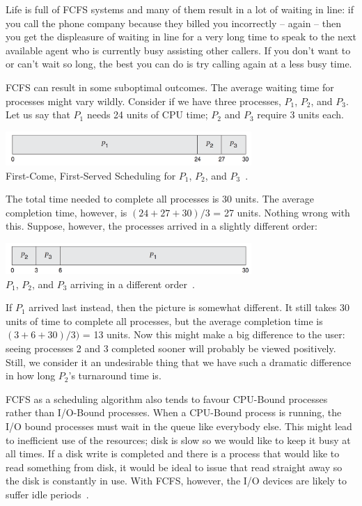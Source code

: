 Life is full of FCFS systems and many of them result in a lot of waiting in line: if you call the phone company because they billed you incorrectly -- again -- then you get the displeasure of waiting in line for a very long time to speak to the next available agent who is currently busy assisting other callers. If you don't want to or can't wait so long, the best you can do is try calling again at a less busy time.

FCFS can result in some suboptimal outcomes. The average waiting time for processes might vary wildly. Consider if we have three processes, $P_{1}$, $P_{2}$, and $P_{3}$. Let us say that $P_{1}$ needs 24 units of CPU time; $P_{2}$ and $P_{3}$ require 3 units each.

\begin{center}
	\includegraphics[width=0.7\textwidth]{images/fcfs-1.png}\\
	First-Come, First-Served Scheduling for $P_{1}$, $P_{2}$, and $P_{3}$~\cite{osc}.
\end{center}

The total time needed to complete all processes is 30 units. The average completion time, however, is $(24 + 27 + 30) / 3$ = 27 units. Nothing wrong with this. Suppose, however, the processes arrived in a slightly different order:

\begin{center}
	\includegraphics[width=0.7\textwidth]{images/fcfs-2.png}\\
	$P_{1}$, $P_{2}$, and $P_{3}$ arriving in a different order~\cite{osc}.
\end{center}

If $P_{1}$ arrived last instead, then the picture is somewhat different. It still takes 30 units of time to complete all processes, but the average completion time is $(3 + 6 + 30) / 3)$ = 13 units. Now this might make a big difference to the user: seeing processes 2 and 3 completed sooner will probably be viewed positively. Still, we consider it an undesirable thing that we have such a dramatic difference in how long $P_{2}$'s turnaround time is.

FCFS as a scheduling algorithm also tends to favour CPU-Bound processes rather than I/O-Bound processes. When a CPU-Bound process is running, the I/O bound processes must wait in the queue like everybody else. This might lead to inefficient use of the resources; disk is slow so we would like to keep it busy at all times. If a disk write is completed and there is a process that would like to read something from disk, it would be ideal to issue that read straight away so the disk is constantly in use. With FCFS, however, the I/O devices are likely to suffer idle periods~\cite{osi}.

